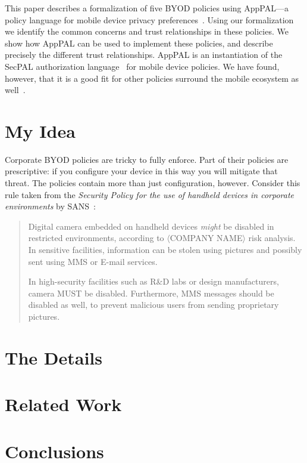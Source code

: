 \documentclass{article}
\begin{document}
This paper describes a formalization of five BYOD policies using AppPAL---a policy language for mobile device privacy preferences~\cite{hallett_apppal_2016}.
Using our formalization we identify the common concerns and trust relationships in these policies.
We show how AppPAL can be used to implement these policies, and describe precisely the different trust relationships.
AppPAL is an instantiation of the SecPAL authorization language~\cite{becker_secpal:_2010} for mobile device policies.
We have found, however, that it is a good fit for other policies surround the mobile ecosystem as well~\cite{hallett_specifying_2016}.

\section{My Idea}
\label{sec:idea}

Corporate BYOD policies are tricky to fully enforce.
Part of their policies are prescriptive:  if you configure your device in this way you will mitigate that threat.
The policies contain more than just configuration, however.
Consider this rule taken from the \emph{Security Policy for the use of handheld devices in corporate environments} by SANS~\cite{nicholas_r._c._guerin_security_2008}:

\begin{quote}
  Digital camera embedded on handheld devices \emph{might} be disabled in restricted environments, according to $\langle$COMPANY NAME$\rangle$ risk analysis. 
  In sensitive facilities, information can be stolen using pictures and possibly sent using MMS or E-mail services.

  In high-security facilities such as R&D labs or design manufacturers, camera MUST be disabled.
  Furthermore, MMS messages should be disabled as well, to prevent malicious users from sending proprietary pictures.
\end{quote}



\section{The Details}
\label{sec:details}

\section{Related Work}
\label{sec:related}

\section{Conclusions}
\label{sec:conclusions}



{}

\end{document}
